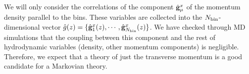 \documentclass[b5paper,openright,10pt]{book}
\newcommand{\esc}{\!\cdot\!}
\newcommand{\llangle}{\left\langle}
\newcommand{\rrangle}{\right\rangle}
\begin{document}
We  will only  consider the correlations  of the
component  $\hat{{\bf g}}^x_\mu$ of  the  momentum density  parallel to  the
bins. These variables are collected into the $N_{\rm bin}$-dimensional
vector           $\hat{g}(z)=\{\hat{{\bf g}}^x_1(z),\cdots,\hat{{\bf g}}^x_{N_{\rm
    bin}}(z)\}$.  We  have checked  through MD  simulations that  the coupling
between  this  component  and   the  rest  of  hydrodynamic  variables
(density,  other momentum  components) is  negligible.  Therefore,  we
expect  that a  theory  of  just the  transverse  momentum  is a  good
candidate for  a Markovian theory.  

%
\end{document}
